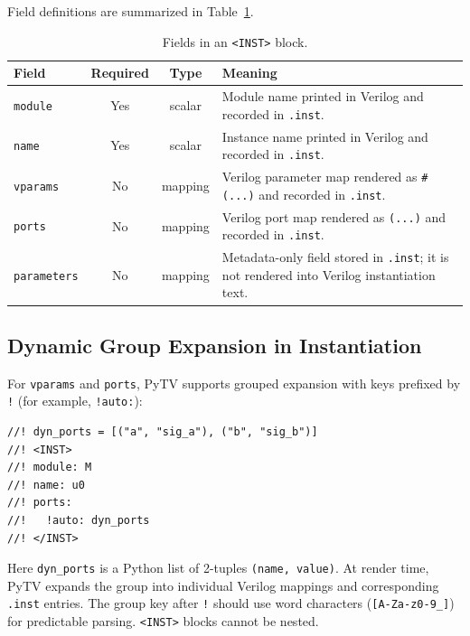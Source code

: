 Field definitions are summarized in Table~\ref{tab:inst-fields}.
\begin{table}[htbp]
\centering
\small
\caption{Fields in an \texttt{<INST>} block.}
\label{tab:inst-fields}
\begin{tabularx}{\linewidth}{@{} l c c X @{}}
\toprule
\textbf{Field} & \textbf{Required} & \textbf{Type} & \textbf{Meaning} \\
\midrule
\texttt{module} & Yes & scalar & Module name printed in Verilog and recorded in \texttt{.inst}. \\
\texttt{name} & Yes & scalar & Instance name printed in Verilog and recorded in \texttt{.inst}. \\
\texttt{vparams} & No & mapping & Verilog parameter map rendered as \texttt{\#(...)} and recorded in \texttt{.inst}. \\
\texttt{ports} & No & mapping & Verilog port map rendered as \texttt{(...)} and recorded in \texttt{.inst}. \\
\texttt{parameters} & No & mapping & Metadata-only field stored in \texttt{.inst}; it is not rendered into Verilog instantiation text. \\
\bottomrule
\end{tabularx}
\normalsize
\end{table}

\subsection{Dynamic Group Expansion in Instantiation}
For \texttt{vparams} and \texttt{ports}, PyTV supports grouped expansion with keys prefixed by \texttt{!}
(for example, \texttt{!auto:}):
\begin{verbatim}
//! dyn_ports = [("a", "sig_a"), ("b", "sig_b")]
//! <INST>
//! module: M
//! name: u0
//! ports:
//!   !auto: dyn_ports
//! </INST>
\end{verbatim}

Here \texttt{dyn\_ports} is a Python list of 2-tuples \texttt{(name, value)}.
At render time, PyTV expands the group into individual Verilog mappings and corresponding \texttt{.inst} entries.
The group key after \texttt{!} should use word characters (\texttt{[A-Za-z0-9\_]}) for predictable parsing.
\texttt{<INST>} blocks cannot be nested.
